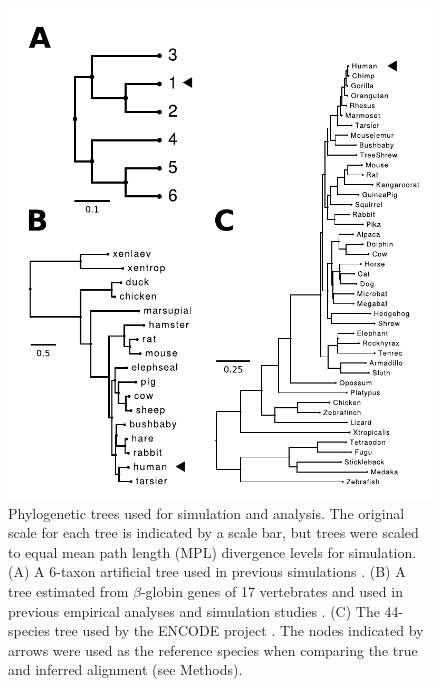 \begin{figure}[t!]
\centering
\includegraphics[scale=0.6]{Figs/fig1.pdf}
\caption{Phylogenetic trees used for simulation and analysis. The
  original scale for each tree is indicated by a scale bar, but trees
  were scaled to equal mean path length (MPL) divergence levels for
  simulation. (A) A 6-taxon artificial tree used in previous
  simulations
  \citep{Anisimova2001,Massingham2005}. (B) A tree
  estimated from $\beta$-globin genes of 17 vertebrates and used in
  previous empirical analyses and simulation studies
  \citep{Anisimova2001,Anisimova2002}. (C) The
  44-species tree used by the ENCODE project
  \citep{Birney2007,Nikolaev2007}. The nodes indicated by
  arrows were used as the reference species when comparing the true
  and inferred alignment (see Methods).}
\label{fig_1}
\end{figure}


